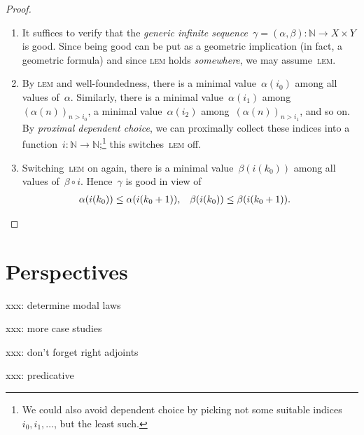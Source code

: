 \documentclass[oneside,reqno]{amsart}
\theoremstyle{definition}
\theoremstyle{plain}
\theoremstyle{remark}
\newcommand{\NN}{\mathbb{N}}
\renewcommand{\_}{\mathpunct{.}\,}
\newcommand{\?}{\,{:}\,}
\begin{document}
\begin{proof}
  \begin{enumerate}
    \item It suffices to verify that the \emph{generic infinite
    sequence}~$\gamma = (\alpha,\beta) : \NN \to X \times Y$ is good. Since
    being good can be put as a geometric implication (in fact, a geometric
    formula) and since \textsc{lem} holds \emph{somewhere}, we may assume~\textsc{lem}.

    \item By \textsc{lem} and well-foundedness, there is a minimal value~$\alpha(i_0)$
    among all values of~$\alpha$.
    Similarly, there is a minimal value~$\alpha(i_1)$ among~$(\alpha(n))_{n >
    i_0}$, a minimal value~$\alpha(i_2)$ among~$(\alpha(n))_{n > i_1}$, and so
    on. By \emph{proximal dependent choice}, we can proximally collect these indices
    into a function~$i : \NN \to \NN$;\footnote{We could also avoid dependent
    choice by picking not some suitable indices~$i_0, i_1, \ldots$, but the
    least such.} this switches~\textsc{lem} off.

    \item Switching~\textsc{lem} on again, there is a minimal value~$\beta(i(k_0))$
    among all values of~$\beta \circ i$. Hence~$\gamma$ is good in view of
    \begin{align*}
      \alpha(i(k_0)) &\leq \alpha(i(k_0+1)), &
      \beta(i(k_0)) &\leq \beta(i(k_0+1)). \qedhere
    \end{align*}
  \end{enumerate}
\end{proof}


\section{Perspectives}

xxx: determine modal laws

xxx: more case studies

xxx: don't forget right adjoints

xxx: predicative
\end{document}

